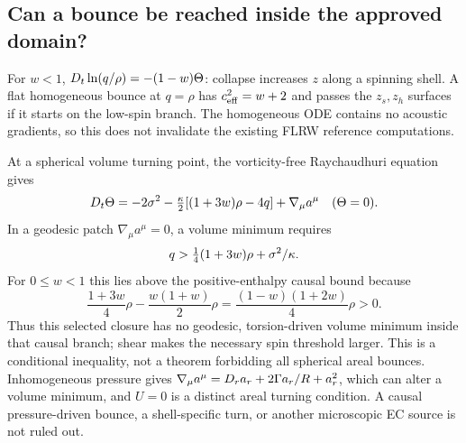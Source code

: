 \subsection{Can a bounce be reached inside the approved domain?}
For $w<1$, $D_t\ln(q/\rho)=-(1-w)\Theta$: collapse increases $z$ along a spinning shell. A flat homogeneous bounce at $q=\rho$ has $c_{\rm eff}^2=w+2$ and passes the $z_s,z_h$ surfaces if it starts on the low-spin branch. The homogeneous ODE contains no acoustic gradients, so this does not invalidate the existing FLRW reference computations.

At a spherical volume turning point, the vorticity-free Raychaudhuri equation gives
\begin{equation}
 D_t\Theta=-2\sigma^2-\tfrac{\kappa}2[(1+3w)\rho-4q]+\nabla_\mu a^\mu
 \quad(\Theta=0).
\end{equation}
In a geodesic patch $\nabla_\mu a^\mu=0$, a volume minimum requires
\begin{equation}
 q>\tfrac14(1+3w)\rho+\sigma^2/\kappa.
\end{equation}
For $0\leq w<1$ this lies above the positive-enthalpy causal bound because
\begin{equation}
 \frac{1+3w}{4}\rho-\frac{w(1+w)}2\rho
 =\frac{(1-w)(1+2w)}4\rho>0.
\end{equation}
Thus this selected closure has no geodesic, torsion-driven volume minimum inside that causal branch; shear makes the necessary spin threshold larger. This is a conditional inequality, not a theorem forbidding all spherical areal bounces. Inhomogeneous pressure gives $\nabla_\mu a^\mu=D_r a_r+2\Gamma a_r/R+a_r^2$, which can alter a volume minimum, and $U=0$ is a distinct areal turning condition. A causal pressure-driven bounce, a shell-specific turn, or another microscopic EC source is not ruled out.
